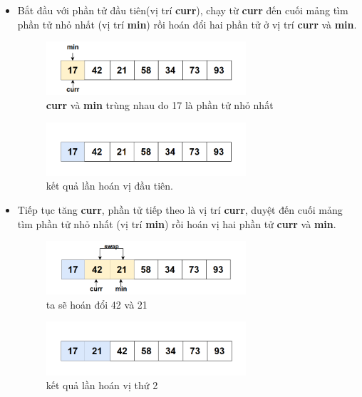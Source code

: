 \begin{itemize}
\item Bắt đầu với phần tử đầu tiên(vị trí \textbf{curr}), chạy từ \textbf{curr} đến cuối mảng tìm phần tử nhỏ nhất (vị trí \textbf{min}) rồi hoán đổi hai phần tử ở vị trí \textbf{curr} và \textbf{min}. 
\begin{figure}[H]
    \centering
    \includegraphics[width=0.7\textwidth]{img/selection sort/2.png}
    \caption{\textbf{curr} và \textbf{min} trùng nhau do 17 là phần tử nhỏ nhất}
\end{figure}

\begin{figure}[H]
    \centering
    \includegraphics[width=0.7\textwidth]{img/selection sort/3.png}
    \caption{kết quả lần hoán vị đầu tiên.}
\end{figure}

\item Tiếp tục tăng \textbf{curr}, phần tử tiếp theo là vị trí \textbf{curr}, duyệt đến cuối mảng tìm phần tử nhỏ nhất (vị trí \textbf{min}) rồi hoán vị hai phần tử \textbf{curr} và \textbf{min}.

\begin{figure}[H]
    \centering
    \includegraphics[width=0.7\textwidth]{img/selection sort/4.png}
    \caption{ta sẽ hoán đổi 42 và 21}
\end{figure}

\begin{figure}[H]
    \centering
    \includegraphics[width=0.7\textwidth]{img/selection sort/5.png}
    \caption{kết quả lần hoán vị thứ 2} 
\end{figure}


\end{itemize}
